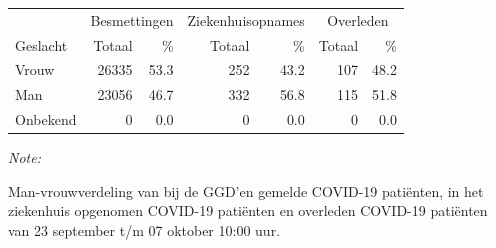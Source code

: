 \documentclass[
  english,
  man,floatsintext]{apa6}
\begin{document}
\begin{table}[H]
\centering\begingroup\fontsize{11}{13}\selectfont

\begin{threeparttable}
\begin{tabular}{lrrrrrr}
\toprule
\multicolumn{1}{c}{ } & \multicolumn{2}{c}{Besmettingen} & \multicolumn{2}{c}{Ziekenhuisopnames} & \multicolumn{2}{c}{Overleden} \\
\cmidrule(l{3pt}r{3pt}){2-3} \cmidrule(l{3pt}r{3pt}){4-5} \cmidrule(l{3pt}r{3pt}){6-7}
Geslacht & Totaal & \% & Totaal & \% & Totaal & \%\\
\midrule
Vrouw & 26335 & 53.3 & 252 & 43.2 & 107 & 48.2\\
Man & 23056 & 46.7 & 332 & 56.8 & 115 & 51.8\\
Onbekend & 0 & 0.0 & 0 & 0.0 & 0 & 0.0\\
\bottomrule
\end{tabular}
\begin{tablenotes}
\item \textit{Note: } 
\item Man-vrouwverdeling van bij de GGD’en gemelde COVID-19 patiënten, in het ziekenhuis opgenomen COVID-19 patiënten en overleden COVID-19 patiënten van 23 september t/m 07 oktober 10:00 uur.
\end{tablenotes}
\end{threeparttable}
\endgroup{}
\end{table}
\newpage
\end{document}
